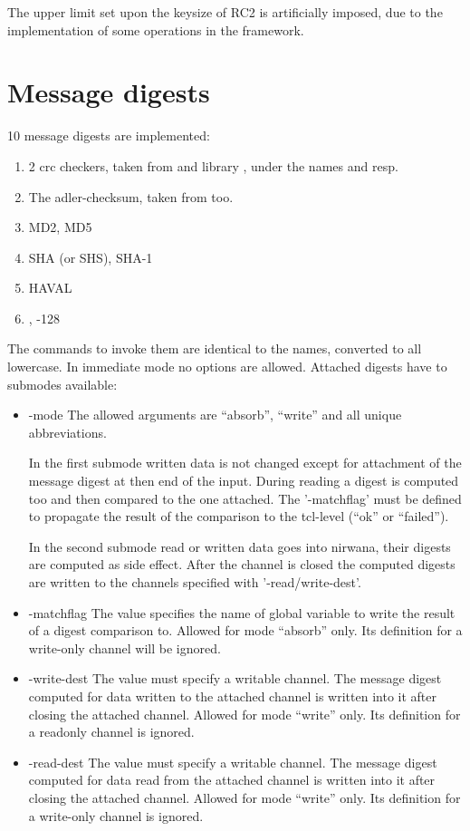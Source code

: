 \documentclass {report}
\begin{document}
The upper limit set upon the keysize of RC2 is artificially imposed,
due to the implementation of some operations in the framework.


\section {Message digests}

10 message digests are implemented:

\begin {enumerate}
\item	2 crc checkers, taken from \PGP{} and library \zlib, under
	the names  and  resp.
\item	The adler-checksum, taken from \zlib{} too.
\item	MD2, MD5
\item	SHA (or SHS), SHA-1
\item	HAVAL
\item	\rmd, -128
\end   {enumerate}

The commands to invoke them are identical to the names, converted to
all lowercase. In immediate mode no options are allowed. Attached
digests have to submodes available:

\begin {itemize}
\item[-mode]	The allowed arguments are ``absorb'', ``write'' and
		all unique abbreviations.

		In the first submode written data is not changed
		except for attachment of the message digest at then
		end of the input. During reading a digest is computed
		too and then compared to the one attached. The
		'-matchflag' must be defined to propagate the result
		of the comparison to the tcl-level (``ok'' or ``failed'').

		In the second submode read or written data goes into
		nirwana, their digests are computed as
		side effect. After the channel is closed the computed
		digests are written to the channels specified with
		'-read/write-dest'.

\item[-matchflag]	The value specifies the name of global
			variable to write the result of a digest
			comparison to. Allowed for mode ``absorb''
			only. Its definition for a write-only channel
			will be ignored.

\item[-write-dest]	The value must specify a writable channel. The
			message digest computed for data written to
			the attached channel is written into it after
			closing the attached channel. Allowed for mode
			``write'' only. Its definition for a readonly
			channel is ignored.

\item[-read-dest]	The value must specify a writable channel. The
			message digest computed for data read from
			the attached channel is written into it after
			closing the attached channel. Allowed for mode
			``write'' only. Its definition for a write-only
			channel is ignored.
\end   {itemize}
\end{document}
